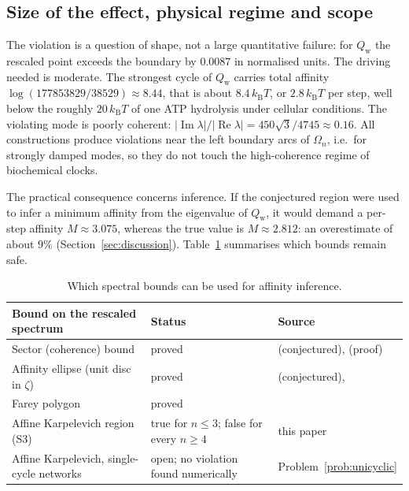 \documentclass[11pt,a4paper]{article}
\numberwithin{equation}{section}
\theoremstyle{definition}
\theoremstyle{remark}
\newcommand{\Om}{\Omega}
\newcommand{\Qw}{Q_{\mathrm{w}}}
\begin{document}
\subsection{Size of the effect, physical regime and scope}

The violation is a question of shape, not a large quantitative failure:
for \(\Qw\) the rescaled point exceeds the boundary by \(0.0087\) in
normalised units. The driving needed is moderate. The strongest cycle
of \(\Qw\) carries total affinity
\(\log(177853829/38529)\approx 8.44\), that is about
\(8.4\,k_{\mathrm B}T\), or \(2.8\,k_{\mathrm B}T\) per step, well
below the roughly \(20\,k_{\mathrm B}T\) of one ATP hydrolysis under
cellular conditions. The violating mode is poorly coherent:
\(|\operatorname{Im}\lambda|/|\operatorname{Re}\lambda|
=450\sqrt3/4745\approx0.16\). All constructions produce violations near
the left boundary arcs of \(\Om_n\), i.e.\ for strongly damped modes,
so they do not touch the high-coherence regime of biochemical clocks.

The practical consequence concerns inference. If the conjectured region
were used to infer a minimum affinity from the eigenvalue of \(\Qw\), it
would demand a per-step affinity \(M\approx3.075\), whereas the true
value is \(M\approx2.812\): an overestimate of about \(9\%\)
(Section~\ref{sec:discussion}). Table~\ref{tab:safe} summarises which
bounds remain safe.

\begin{table}[t]
\centering
\small
\begin{tabular}{@{}p{}p{}p{}@{}}
\toprule
Bound on the rescaled spectrum & Status & Source\\
\midrule
Sector (coherence) bound & proved & \cite{barato2017} (conjectured), \cite{ohga2023} (proof)\\
Affinity ellipse (unit disc in \(\zeta\)) & proved & \cite{uhl2019} (conjectured), \cite{kolchinsky2026}\\
Farey polygon & proved & \cite[Theorem~5]{kolchinsky2026}\\
Affine Karpelevich region (S3) & true for \(n\le3\); false for every \(n\ge4\) & this paper\\
Affine Karpelevich, single-cycle networks & open; no violation found numerically & Problem~\ref{prob:unicyclic}\\
\bottomrule
\end{tabular}
\caption{Which spectral bounds can be used for affinity inference.}
\label{tab:safe}
\end{table}
\end{document}
